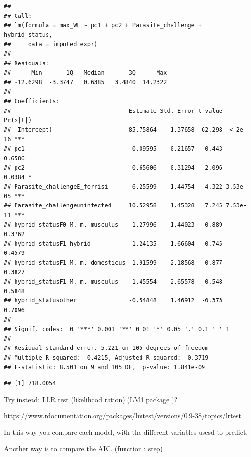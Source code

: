 \documentclass[
]{article}
\begin{document}
\begin{verbatim}
## 
## Call:
## lm(formula = max_WL ~ pc1 + pc2 + Parasite_challenge + hybrid_status, 
##     data = imputed_expr)
## 
## Residuals:
##      Min       1Q   Median       3Q      Max 
## -12.6298  -3.3747   0.6385   3.4840  14.2322 
## 
## Coefficients:
##                                  Estimate Std. Error t value Pr(>|t|)    
## (Intercept)                      85.75864    1.37658  62.298  < 2e-16 ***
## pc1                               0.09595    0.21657   0.443   0.6586    
## pc2                              -0.65606    0.31294  -2.096   0.0384 *  
## Parasite_challengeE_ferrisi       6.25599    1.44754   4.322 3.53e-05 ***
## Parasite_challengeuninfected     10.52958    1.45328   7.245 7.53e-11 ***
## hybrid_statusF0 M. m. musculus   -1.27996    1.44023  -0.889   0.3762    
## hybrid_statusF1 hybrid            1.24135    1.66604   0.745   0.4579    
## hybrid_statusF1 M. m. domesticus -1.91599    2.18568  -0.877   0.3827    
## hybrid_statusF1 M. m. musculus    1.45554    2.65578   0.548   0.5848    
## hybrid_statusother               -0.54848    1.46912  -0.373   0.7096    
## ---
## Signif. codes:  0 '***' 0.001 '**' 0.01 '*' 0.05 '.' 0.1 ' ' 1
## 
## Residual standard error: 5.221 on 105 degrees of freedom
## Multiple R-squared:  0.4215, Adjusted R-squared:  0.3719 
## F-statistic: 8.501 on 9 and 105 DF,  p-value: 1.841e-09
\end{verbatim}

\begin{verbatim}
## [1] 718.0054
\end{verbatim}

Try instead: LLR test (likelihood ration) (LM4 package )?

\url{https://www.rdocumentation.org/packages/lmtest/versions/0.9-38/topics/lrtest}

In this way you compare each model, with the different variables usesd
to predict.

Another way is to compare the AIC. (function : step)
\end{document}
